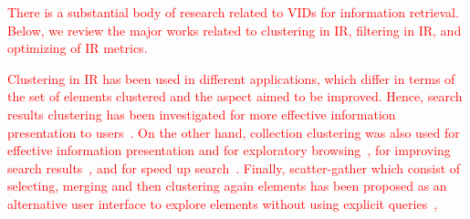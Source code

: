 


\textcolor{red}{There is a substantial body of research related to VIDs for information retrieval. 
Below, we review the major works related to clustering in IR, filtering in IR, and optimizing of IR metrics.}

\textcolor{red}{
Clustering in IR has been used in different applications, which differ in terms of the set of elements clustered and the aspect aimed to be improved. 
Hence, search results clustering has been investigated for more effective information presentation to users~\cite{Altingovde2008,Can2004,Toda2005,Levi2018}. 
On the other hand, collection clustering was also used for effective information presentation and for exploratory browsing~\cite{McKeown2002,Hatzivassiloglou2000}, for improving search results~\cite{Liu2004,Altingovde2007,Kurland2011,Kurland2009}, and for speed up search~\cite{Salton1971,Qumsiyeh2015,Dimond2015}.
Finally, scatter-gather which consist of selecting, merging and then clustering again elements has been proposed as an alternative user interface to explore elements without using explicit queries~\cite{Cutting1992,Pirolli2007},
}




